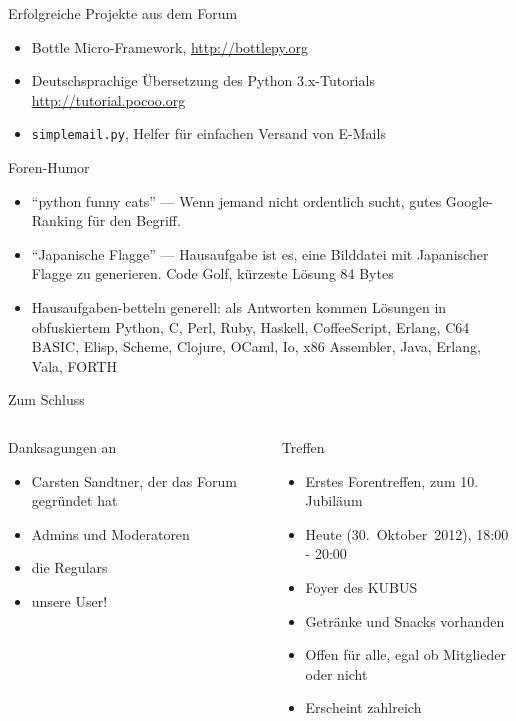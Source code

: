 \documentclass{beamer}
\begin{document}
\begin{frame}{Erfolgreiche Projekte aus dem Forum}
  \begin{itemize}
    \item Bottle Micro-Framework, \url{http://bottlepy.org}
    \item Deutschsprachige Übersetzung des Python 3.x-Tutorials \url{http://tutorial.pocoo.org}
    \item \texttt{simplemail.py}, Helfer für einfachen Versand von E-Mails
  \end{itemize}
\end{frame}

\begin{frame}{Foren-Humor}
  \begin{itemize}
    \item \enquote{python funny cats} — Wenn jemand nicht ordentlich sucht, gutes
      Google-Ranking für den Begriff.
    \item \enquote{Japanische Flagge} — Hausaufgabe ist es, eine Bilddatei mit
      Japanischer Flagge zu generieren. Code Golf, kürzeste Lösung 84 Bytes
    \item Hausaufgaben-betteln generell: als Antworten kommen Lösungen in obfuskiertem
      Python, C, Perl, Ruby, Haskell, CoffeeScript, Erlang, C64 BASIC, Elisp, Scheme,
      Clojure, OCaml, Io, x86 Assembler, Java, Erlang, Vala, FORTH
  \end{itemize}
\end{frame}

\begin{frame}{Zum Schluss}
  \begin{columns}[t]
  \begin{block}{Danksagungen an}
    \begin{itemize}
      \item Carsten Sandtner, der das Forum gegründet hat
      \item Admins und Moderatoren
      \item die Regulars
      \item unsere User!
    \end{itemize}
  \end{block}
  \begin{block}{Treffen}
    \begin{itemize}
      \item Erstes Forentreffen, zum 10. Jubiläum
      \item Heute (30.~Oktober~2012), 18:00 - 20:00
      \item Foyer des KUBUS
      \item Getränke und Snacks vorhanden
      \item Offen für alle, egal ob Mitglieder oder nicht
      \item Erscheint zahlreich 
    \end{itemize}
  \end{block}
  \end{columns}
\end{frame}
\end{document}
